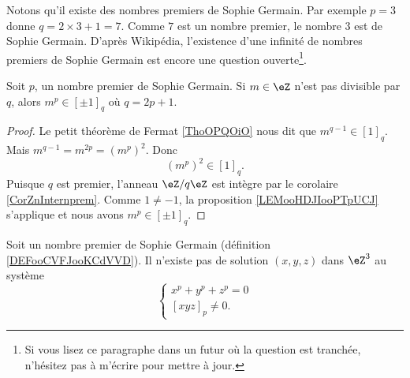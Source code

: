 Notons qu'il existe des nombres premiers de Sophie Germain. Par exemple \( p=3\) donne \(q=2\times 3+1=7 \). Comme \( 7\) est un nombre premier, le nombre \( 3\) est de Sophie Germain. D'après Wikipédia\cite{BIBooVLZQooEwgrZJ}, l'existence d'une infinité de nombres premiers de Sophie Germain est encore une question ouverte\footnote{Si vous lisez ce paragraphe dans un futur où la question est tranchée, n'hésitez pas à m'écrire pour mettre à jour.}.

\begin{lemma}       \label{LEMooIYIKooGkoqRJ}
	Soit \( p\), un nombre premier de Sophie Germain. Si \( m\in \eZ\) n'est pas divisible par \( q\), alors \( m^p\in[\pm 1]_q\) où \( q=2p+1\).
\end{lemma}

\begin{proof}
	Le petit théorème de Fermat \ref{ThoOPQOiO} nous dit que \( m^{q-1}\in [1]_q\). Mais \( m^{q-1}=m^{2p}=(m^p)^2\). Donc
	\begin{equation}
		(m^p)^2\in[1]_q.
	\end{equation}
	Puisque \( q\) est premier, l'anneau \( \eZ/q\eZ\) est intègre par le corolaire \ref{CorZnInternprem}. Comme \( 1\neq -1\), la proposition \ref{LEMooHDJIooPTpUCJ} s'applique et nous avons \( m^p\in[\pm 1]_q\).
\end{proof}

\begin{theorem}     \label{THOooSZXWooVeHdrh}
	Soit un nombre premier de Sophie Germain (définition \ref{DEFooCVFJooKCdVVD}). Il n'existe pas de solution \( (x,y,z)\) dans \( \eZ^3\) au système
	\begin{equation}
		\begin{cases}
			x^p+y^p+z^p=0 \\
			[xyz]_p\neq 0.
		\end{cases}
	\end{equation}
\end{theorem}

